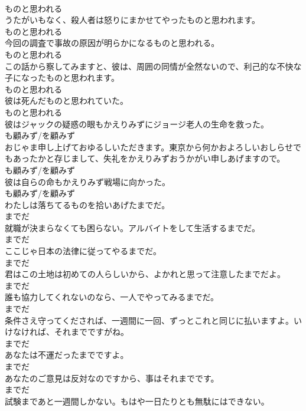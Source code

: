 \documentclass[8pt]{extreport}
\begin{document}
\begin{CJK}{UTF8}{min}
\\	ものと思われる	
\\	うたがいもなく、殺人者は怒りにまかせてやったものと思われます。	
\\	ものと思われる	
\\	今回の調査で事故の原因が明らかになるものと思われる。	
\\	ものと思われる	
\\	この話から察してみますと、彼は、周囲の同情が全然ないので、利己的な不快な子になったものと思われます。	
\\	ものと思われる	
\\	彼は死んだものと思われていた。	
\\	ものと思われる	
\\	彼はジャックの疑惑の眼もかえりみずにジョージ老人の生命を救った。	
\\	も顧みず/を顧みず	
\\	おじゃま申し上げておゆるしいただきます。東京から何かおよろしいおしらせでもあったかと存じまして、失礼をかえりみずおうかがい申しあげますので。	
\\	も顧みず/を顧みず	
\\	彼は自らの命もかえりみず戦場に向かった。	
\\	も顧みず/を顧みず	
\\	わたしは落ちてるものを拾いあげたまでだ。	
\\	までだ	
\\	就職が決まらなくても困らない。アルバイトをして生活するまでだ。	
\\	までだ	
\\	ここじゃ日本の法律に従ってやるまでだ。	
\\	までだ	
\\	君はこの土地は初めての人らしいから、よかれと思って注意したまでだよ。	
\\	までだ	
\\	誰も協力してくれないのなら、一人でやってみるまでだ。	
\\	までだ	
\\	条件さえ守ってくだされば、一週間に一回、ずっとこれと同じに払いますよ。いけなければ、それまでですがね。	
\\	までだ	
\\	あなたは不運だったまでですよ。	
\\	までだ	
\\	あなたのご意見は反対なのですから、事はそれまでです。	
\\	までだ	
\\	試験まであと一週間しかない。もはや一日たりとも無駄にはできない。	

\end{CJK}
\end{document}
